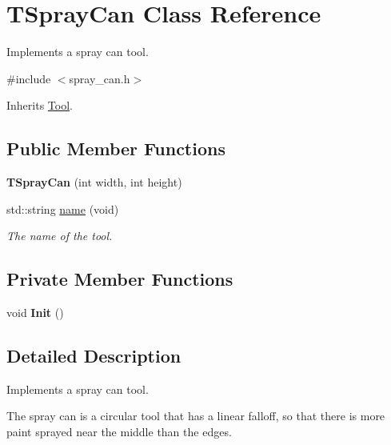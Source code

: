 \hypertarget{classTSprayCan}{}\section{T\+Spray\+Can Class Reference}
\label{classTSprayCan}


Implements a spray can tool.  




{\ttfamily \#include $<$spray\+\_\+can.\+h$>$}



Inherits \hyperlink{classTool}{Tool}.

\subsection*{Public Member Functions}
\begin{DoxyCompactItemize}
\item 
{\bfseries T\+Spray\+Can} (int width, int height)\hypertarget{classTSprayCan_a8c0e46ecce0421694061ac16674ed22f}{}\label{classTSprayCan_a8c0e46ecce0421694061ac16674ed22f}

\item 
std\+::string \hyperlink{classTSprayCan_a7261eb9cbaedf904ba8bc23ae40d39c1}{name} (void)
\begin{DoxyCompactList}\small\item\em The name of the tool. \end{DoxyCompactList}\end{DoxyCompactItemize}
\subsection*{Private Member Functions}
\begin{DoxyCompactItemize}
\item 
void {\bfseries Init} ()\hypertarget{classTSprayCan_a1d917d7f15a33198d2999cc2d379a222}{}\label{classTSprayCan_a1d917d7f15a33198d2999cc2d379a222}

\end{DoxyCompactItemize}


\subsection{Detailed Description}
Implements a spray can tool. 

The spray can is a circular tool that has a linear falloff, so that there is more paint sprayed near the middle than the edges. 

